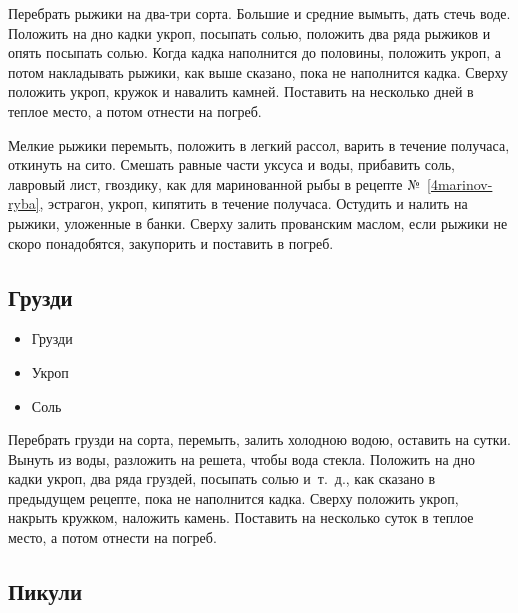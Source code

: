 Перебрать рыжики на два-три сорта. Большие и средние вымыть, дать стечь воде. Положить на дно кадки укроп, посыпать солью, положить два ряда рыжиков и опять посыпать солью. Когда кадка наполнится до половины, положить укроп, а потом накладывать рыжики, как выше сказано, пока не наполнится кадка. Сверху положить укроп, кружок и навалить камней. Поставить на несколько дней в теплое место, а потом отнести на погреб.

Мелкие рыжики перемыть, положить в легкий рассол, варить в течение получаса, откинуть на сито. Смешать равные части уксуса и воды, прибавить соль, лавровый лист, гвоздику, как для маринованной рыбы в рецепте №~\ref{4marinov-ryba}, эстрагон, укроп, кипятить в течение получаса. Остудить и налить на рыжики, уложенные в банки. Сверху залить прованским маслом, если рыжики не скоро понадобятся, закупорить и поставить в погреб.

\subsection{Грузди}

\begin{itemize}
	\item Грузди 
    \item Укроп
    \item Соль
\end{itemize}

Перебрать грузди на сорта, перемыть, залить холодною водою, оставить на сутки. Вынуть из воды, разложить на решета, чтобы вода стекла. Положить на дно кадки укроп, два ряда груздей, посыпать солью и~т.~д., как сказано в предыдущем рецепте, пока не наполнится кадка. Сверху положить укроп, накрыть кружком, наложить камень. Поставить на несколько суток в теплое место, а потом отнести на погреб.

\subsection{Пикули}

